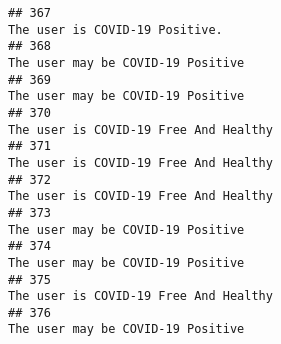 \documentclass[
]{article}
\begin{document}
\begin{verbatim}
## 367                                                                                                                                                                                                                                     The user is COVID-19 Positive.
## 368                                                                                                                                                                                                                                  The user may be COVID-19 Positive
## 369                                                                                                                                                                                                                                  The user may be COVID-19 Positive
## 370                                                                                                                                                                                                                              The user is COVID-19 Free And Healthy
## 371                                                                                                                                                                                                                              The user is COVID-19 Free And Healthy
## 372                                                                                                                                                                                                                              The user is COVID-19 Free And Healthy
## 373                                                                                                                                                                                                                                  The user may be COVID-19 Positive
## 374                                                                                                                                                                                                                                  The user may be COVID-19 Positive
## 375                                                                                                                                                                                                                              The user is COVID-19 Free And Healthy
## 376                                                                                                                                                                                                                                  The user may be COVID-19 Positive

\end{verbatim}
\end{document}
